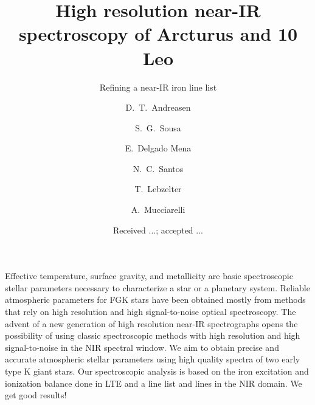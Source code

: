 \documentclass{aa}
\begin{document}
\title{High resolution near-IR spectroscopy of Arcturus and 10 Leo}
\subtitle{Refining a near-IR iron line list}


\author{ D.~T.~Andreasen
    \and S.~G.~Sousa
    \and E.~Delgado Mena
    \and N.~C.~Santos
    \and T.~Lebzelter
    \and A.~Mucciarelli}







\date{Received ...; accepted ...}

\abstract
{Effective temperature, surface gravity, and metallicity are basic
spectroscopic stellar parameters necessary to characterize
a star or a planetary system. Reliable atmospheric parameters for
FGK stars have been obtained mostly from methods that rely on high
resolution and high signal-to-noise optical spectroscopy. The
advent of a new generation of high resolution near-IR spectrographs
opens the possibility of using classic spectroscopic methods with
high resolution and high signal-to-noise in the NIR spectral window.}
{We aim to obtain precise and accurate atmospheric stellar parameters using
high quality spectra of two early type K giant stars.}
{Our spectroscopic analysis is based on the iron excitation and ionization
balance done in LTE and a line list  and  lines in the
NIR domain.}
{We get good results!}
{}



\maketitle
\end{document}
